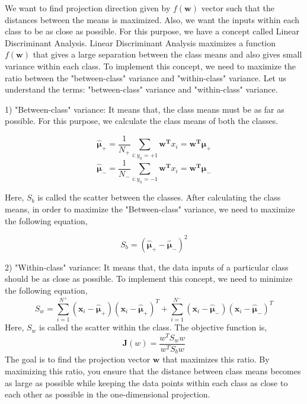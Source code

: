 \documentclass[a4paper,11pt]{article}
\begin{document}
\begin{mlsolution} 

We want to find projection direction given by $f(\textbf{w})$ vector such that the distances between the means is maximized. Also, we want the inputs within each class to be as close as possible. For this purpose, we have a concept called Linear Discriminant Analysis. Linear Discriminant Analysis maximizes a function $f(\textbf{w})$ that gives a large separation between the class means and also gives small variance within each class. \newline
To implement this concept, we need to maximize the ratio between the "between-class" variance and "within-class" variance. Let us understand the terms: "between-class" variance and "within-class" variance. \newline

1) "Between-class" variance: It means that, the class means must be as far as possible.
For this purpose, we calculate the class means of both the classes.

\begin{equation}
	\boxed{\bm{\hat{\mu}}_+ = \frac{1}{N_+} \sum_{i: y_n = +1}\mathbf{w^T} x_i = \mathbf{w^T\bm{\mu}_+}  }
\end{equation}
\begin{equation}
	\boxed{\bm{\hat{\mu}}_- = \frac{1}{N_-} \sum_{i: y_n = -1}\mathbf{w^T} x_i = \mathbf{w^T\bm{\mu}_-}  }
\end{equation}

Here, $S_b$ is called the scatter between the classes. After calculating the class means, in order to maximize the "Between-class" variance, we need to maximize the following equation,

\begin{equation}
	\boxed{S_b = (\bm{\hat{\mu}}_+ - \bm{\hat{\mu}}_-)^2 }
\end{equation}

2) "Within-class" variance: It means that, the data inputs of a particular class should be as close as possible. To implement this concept, we need to minimize the following equation,
\begin{equation}
	\boxed{S_w = \sum_{i=1}^{N^+} (\textbf{x}_i - \bm{\hat{\mu}}_+)(\textbf{x}_i - \bm{\hat{\mu}}_+)^T + \sum_{i=1}^{N^-} (\textbf{x}_i - \bm{\hat{\mu}}_-)(\textbf{x}_i - \bm{\hat{\mu}}_-)^T}	
\end{equation}
Here, $S_w$ is called the scatter within the class.
The objective function is,
\begin{equation}
\boxed{\bm{J}(w) = \frac{w^T S_w w}{w^T S_b w}}	
\end{equation}
The goal is to find the projection vector $\mathbf{w}$ that maximizes this ratio. By maximizing this ratio, you ensure that the distance between class means becomes as large as possible while keeping the data points within each class as close to each other as possible in the one-dimensional projection.


\end{mlsolution}
\end{document}
